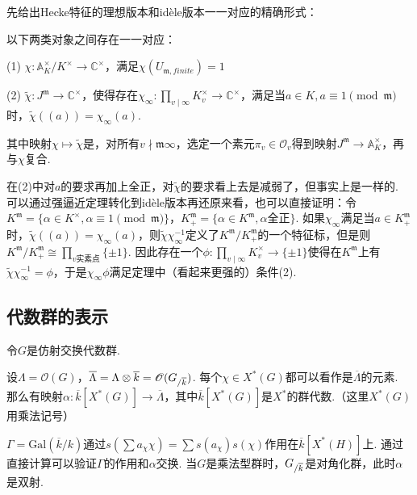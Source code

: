 先给出Hecke特征的理想版本和idèle版本一一对应的精确形式：

\begin{cthm}
    以下两类对象之间存在一一对应：

    (1) $\chi: \mathbb{A}_K^{\times}/K^{\times} \to \mathbb{C}^{\times}$，满足$\chi(U_{\mathfrak{m}, finite}) = 1$

    (2) $\tilde{\chi}: J^{\mathfrak{m}}\to \mathbb{C}^{\times}$，使得存在$\chi_{\infty}:\prod_{v\mid \infty}K_v^{\times} \to \mathbb{C}^{\times}$，满足当$a\in K, a\equiv 1\pmod{\mathfrak{m}}$时，$\tilde{\chi}((a)) = \chi_{\infty}(a)$.

    其中映射$\chi\mapsto \tilde{\chi}$是，对所有$v\nmid \mathfrak{m}\infty$，选定一个素元$\pi_v\in \mathcal{O}_v$得到映射$J^{\mathfrak{m}}\to \mathbb{A}_K^{\times}$，再与$\chi$复合.
\end{cthm}

\begin{crem}
    在(2)中对$a$的要求再加上全正，对$\tilde{\chi}$的要求看上去是减弱了，但事实上是一样的. 可以通过强逼近定理转化到idèle版本再还原来看，也可以直接证明：令$K^{\mathfrak{m}} = \{\alpha\in K^{\times}, \alpha\equiv 1\pmod{\mathfrak{m}}\}$，$K^{\mathfrak{m}}_{+} = \{\alpha\in K^{\mathfrak{m}}, \alpha 全正\}$. 如果$\chi_{\infty}$满足当$a\in K^{\mathfrak{m}}_{+}$时，$\tilde{\chi}((a)) = \chi_{\infty}(a)$，则$\tilde{\chi}\chi_{\infty}^{-1}$定义了$K^{\mathfrak{m}}/K^{\mathfrak{m}}_{+}$的一个特征标，但是则$K^{\mathfrak{m}}/K^{\mathfrak{m}}_{+} \cong \prod_{v实素点} \{\pm 1\}$. 因此存在一个$\phi: \prod_{v\mid \infty} K_v^{\times}\to \{\pm 1\}$使得在$K^{\mathfrak{m}}$上有$\tilde{\chi}\chi_{\infty}^{-1} = \phi$，于是$\chi_{\infty}\phi$满足定理中（看起来更强的）条件(2).
\end{crem}


\subsection{代数群的表示}

令$G$是仿射交换代数群.

设$\Lambda = \mathscr{O}(G)$，$\overline{\Lambda} = \Lambda \otimes \overline{k} = \mathscr{O}({G}_{/\overline{k}})$.
每个$\chi\in X^{*}(G)$都可以看作是$\overline{\Lambda}$的元素.
那么有映射$\alpha: \overline{k}[X^{*}(G)] \to \overline{\Lambda}$，其中$\overline{k}[X^{*}(G)]$是$X^{*}$的群代数.（这里$X^{*}(G)$用乘法记号）

$\Gamma = \mathrm{Gal}(\overline{k}/k)$通过$s(\sum a_{\chi} \chi) = \sum s(a_{\chi}) s(\chi)$作用在$\overline{k}[X^{*}(H)]$上.
通过直接计算可以验证$\Gamma$的作用和$\alpha$交换.
当$G$是乘法型群时，${G}_{/\overline{k}}$是对角化群，此时$\alpha$是双射.

